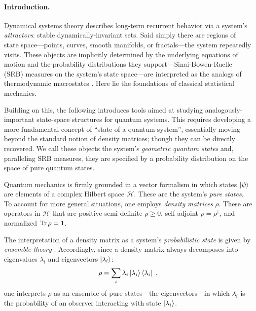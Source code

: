 \documentclass[draft,nofootinbib,pre,twocolumn,showpacs,showkeys,preprintnumbers,floatfix]{revtex4-1}
\newcommand{\1}{\mathbbm{1}}
\begin{document}
\paragraph*{Introduction.} Dynamical systems theory describes long-term
recurrent behavior via a system's \emph{attractors}: stable
dynamically-invariant sets. Said simply there are regions of state
space---points, curves, smooth manifolds, or fractals---the system repeatedly
visits. These objects are implicitly determined by the underlying equations of
motion and the probability distributions they support---Sinai-Bowen-Ruelle (SRB)
measures on the system's state space---are interpreted as the analogs of
thermodynamic macrostates \cite{Eckmann1985,Beck93a}. Here lie the foundations
of classical statistical mechanics.

Building on this, the following introduces tools aimed at studying
analogously-important state-space structures for quantum systems. This requires
developing a more fundamental concept of ``state of a quantum system'',
essentially moving beyond the standard notion of density matrices; though they
can be directly recovered. We call these objects the system's \emph{geometric
quantum states} and, paralleling SRB measures, they are specified by a
probability distribution on the space of pure quantum states.

Quantum mechanics is firmly grounded in a vector formalism in which states
$\ket{\psi}$ are elements of a complex Hilbert space $\mathcal{H}$. These are
the system's \emph{pure states}. To account for more general situations, one
employs \emph{density matrices} $\rho$. These are operators in $\mathcal{H}$
that are positive semi-definite $\rho \geq 0$, self-adjoint $\rho
=\rho^\dagger$, and normalized $\Tr \rho = 1$.

The interpretation of a density matrix as a system's \emph{probabilistic state}
is given by \emph{ensemble theory} \cite{Pathria2011,Greiner1995}. Accordingly,
since a density matrix always decomposes into eigenvalues $\lambda_i$ and
eigenvectors $\ket{\lambda_i}$:
\begin{align}
\rho = \sum_i \lambda_i \ket{\lambda_i}\bra{\lambda_i}
  ~,
\label{eq:DiadDecomp}
\end{align}
one interprets $\rho$ as an ensemble of pure states---the eigenvectors---in
which $\lambda_i$ is the probability of an observer interacting with
state $\ket{\lambda_i}$.
\end{document}
